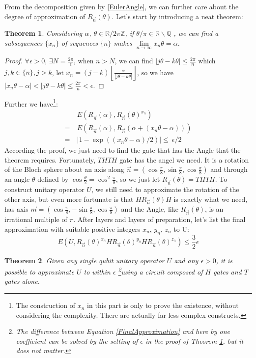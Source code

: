 \documentclass[a4paper,10pt]{article}
\newtheorem{theorem}{Theorem}[subsection]
\numberwithin{equation}{subsection}
\begin{document}
From the decomposition given by \ref{EulerAngle}, we can further care about the degree of approximation of $R_{\vec{n}}(\theta)$. Let's start by introducing a neat theorem:
\begin{theorem}\label{AngleCoverR}
    Considering $\alpha$, $\theta \in \mathbb{R} /2\pi\mathbb{Z}$, if $\theta/\pi \in \mathbb{R} \backslash \mathbb{Q}$ , we can find a subsequences $\{x_n\}$ of sequences $\{n\}$ makes $\lim\limits_{n\to\infty}x_n\theta = \alpha$.
\end{theorem}
\begin{proof}
    $\forall \epsilon>0$, $\exists N=\frac{2\pi}{\epsilon}$, when $n>N$, we can find $|j\theta-k\theta|\leq\frac{2\pi}{n}$ which $j,k \in \{n\},j>k$, let $x_{n} = (j-k)\left\lfloor\frac{\alpha}{|j\theta-k\theta|}\right\rfloor$, so we have $|x_{n}\theta-\alpha|<|j\theta-k\theta|\leq\frac{2\pi}{n}<\epsilon$.
\end{proof}
Further we have\footnote{The construction of $x_{n}$ in this part is only to prove the existence, without considering the complexity. There are actually far less complex constructs.}:
\begin{equation}
    \begin{split}
          & \ E(R_{\vec{n}}(\alpha),R_{\vec{n}}(\theta)^{x_{n}})              \\
        = & \ E(R_{\vec{n}}(\alpha),R_{\vec{n}}(\alpha+(x_{n}\theta-\alpha))) \\
        = & \ |1-\exp((x_{n}\theta-\alpha)/2)|\leq\ \epsilon/2
    \end{split}
\end{equation}
According the proof, we just need to find the gate that has the Angle that the theorem requires. Fortunately, $THTH$ gate has the angel we need. It is a rotation of the Bloch sphere about an axis along $\vec{n} = (\cos\frac{\pi}{8},\sin\frac{\pi}{8},\cos\frac{\pi}{8})$ and through an angle $\theta$ defined by $\cos\frac{\theta}{2} = \cos^{2}\frac{\pi}{8}$, so we just let $R_{\vec{n}}(\theta) = THTH$. To construct unitary operator $U$, we still need to approximate the rotation of the other axis, but even more fortunate is that $HR_{\vec{n}}(\theta)H$ is exactly what we need, has axis $\vec{m} = (\cos\frac{\pi}{8},-\sin\frac{\pi}{8},\cos\frac{\pi}{8})$ and the Angle, like $R_{\vec{n}}(\theta)$, is an irrational multiple of $\pi$. After layers and layers of preparation, let's list the final approximation with suitable positive integers $x_{n}$, $y_{n}$, $z_{n}$ to U:
\begin{equation}\label{FinalApproximation}
    E(U,R_{\vec{n}}(\theta)^{x_{n}}HR_{\vec{n}}(\theta)^{y_{n}}HR_{\vec{n}}(\theta)^{z_{n}}) \leq \frac{3}{2}\epsilon
\end{equation}
\begin{theorem}
    Given any single qubit unitary operator $U$ and any $\epsilon > 0$, it is possible to approximate $U$ to within $\epsilon$ \footnote{The difference between Equation \ref{FinalApproximation} and here by one coefficient can be solved by the setting of $\epsilon$ in the proof of Theorem \ref{AngleCoverR}, but it does not matter. }using a circuit composed of $H$ gates and $T$ gates alone.
\end{theorem}
\end{document}
